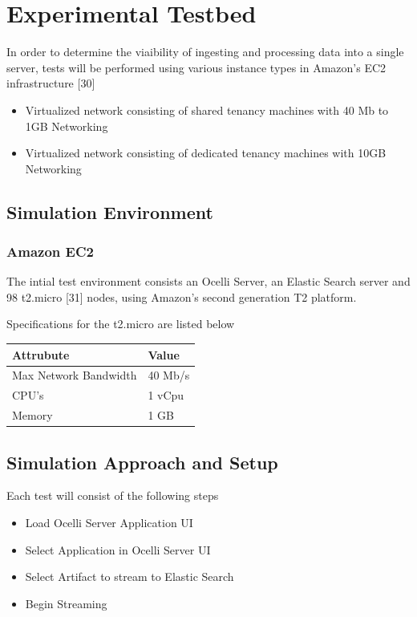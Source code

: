 \documentclass{llncs}
\begin{document}
\section{Experimental Testbed}

In order to determine the viaibility of ingesting and processing data into a single server, tests will be performed using various instance types in Amazon's EC2 infrastructure [30]

\begin{itemize}
\item Virtualized network consisting of shared tenancy machines with 40 Mb to 1GB Networking
\item Virtualized network consisting of dedicated tenancy machines with 10GB Networking
\end{itemize}

\subsection{Simulation Environment}

\subsubsection{Amazon EC2}

The intial test environment consists an Ocelli Server, an Elastic Search server and 98 t2.micro [31] nodes, using Amazon's second generation T2 platform.

Specifications for the t2.micro are listed below

\begin{flushleft}
    \begin{tabular}{ | l | l |}
    \hline
  Attrubute & Value  \\ \hline
Max Network Bandwidth &  40 Mb/s	\\ \hline
CPU's &  1 vCpu	\\ \hline
Memory &  1 GB	\\ 
    \hline
    \end{tabular}
\end{flushleft}

\subsection{Simulation Approach and Setup}

Each test will consist of the following steps

\begin{itemize}
\item Load Ocelli Server Application UI
\item Select Application in Ocelli Server UI
\item Select Artifact to stream to Elastic Search
\item Begin Streaming
\end{itemize}
\end{document}
